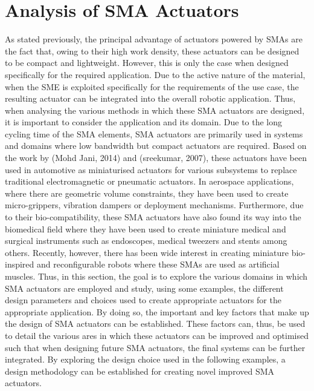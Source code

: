 \section{Analysis of SMA Actuators}
As stated previously, the principal advantage of actuators powered by SMAs are the fact that, owing to their high work density, these actuators can be designed to be compact and lightweight. However, this is only the case when designed specifically for the required application. Due to the active nature of the material, when the SME is exploited specifically for the requirements of the use case, the resulting actuator can be integrated into the overall robotic application. Thus, when analysing the various methods in which these SMA actuators are designed, it is important to consider the application and its domain. Due to the long cycling time of the SMA elements, SMA actuators are primarily used in systems and domains where low bandwidth but compact actuators are required. Based on the work by \todocite (Mohd Jani, 2014) and \todocite (sreekumar, 2007), these actuators have been used in automotive as miniaturised actuators for various subsystems to replace traditional electromagnetic or pneumatic actuators. In aerospace applications, where there are geometric volume constraints, they have been used to create micro-grippers, vibration dampers or deployment mechanisms. Furthermore, due to their bio-compatibility, these SMA actuators have also found its way into the biomedical field where they have been used to create miniature medical and surgical instruments such as endoscopes, medical tweezers and stents among others. Recently, however, there has been wide interest in creating miniature bio-inspired and reconfigurable robots where these SMAs are used as artificial muscles. Thus, in this section, the goal is to explore the various domains in which SMA actuators are employed and study, using some examples, the different design parameters and choices used to create appropriate actuators for the appropriate application. By doing so, the important and key factors that make up the design of SMA actuators can be established. These factors can, thus, be used to detail the various ares in which these actuators can be improved and optimised such that when designing future SMA actuators, the final systems can be further integrated. By exploring the design choice used in the following examples, a design methodology can be established for creating novel improved SMA actuators.

